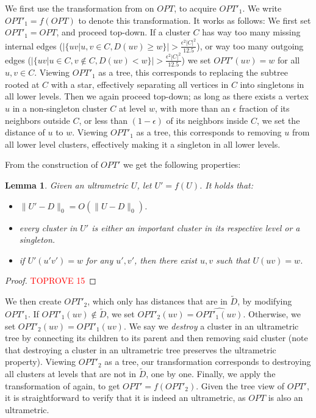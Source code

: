 \documentclass{article}
\newtheorem{lemma}[theorem]{Lemma}
\newcommand{\set}[1]{\{#1\}}
\begin{document}
We first use the transformation from \cite{cohen2022fitting} on $OPT$, to acquire $OPT'_1$.
We write $OPT'_1 = f(OPT)$ to denote this transformation.
It works as follows:
We first set $OPT'_1 = OPT$, and proceed top-down.
If a cluster $C$ has way too many missing internal edges ($|\set{uv | u,v \in C, D(uv) \ge w}| > \frac{\epsilon^2 |C|^2}{12.5}$), or way too many outgoing edges ($|\set{uv | u \in C, v \not \in C, D(uv) < w}| > \frac{\epsilon^2 |C|^2}{12.5}$) we set $OPT'(uv)=w$ for all $u,v\in C$.
Viewing $OPT'_1$ as a tree, this corresponds to replacing the subtree rooted at $C$ with a star, effectively separating all vertices in $C$ into singletons in all lower levels.
Then we again proceed top-down; as long as there exists a vertex $u$ in a non-singleton cluster $C$ at level $w$, with more than an $\epsilon$ fraction of its neighbors outside $C$, or less than $(1-\epsilon)$ of its neighbors inside $C$, we set the distance of $u$ to $w$.
Viewing $OPT'_1$ as a tree, this corresponds to removing $u$ from all lower level clusters, effectively making it a singleton in all lower levels.

From the construction of $OPT'$ we get the following properties:

\begin{lemma} \label{lem:transformationVincent}
Given an ultrametric $U$, let $U' = f(U)$.
It holds that:
\begin{itemize}
    \item $\|U'-D\|_0 = O(\|U-D\|_0)$.
    \item every cluster in $U'$ is either an important cluster in its respective level or a singleton.
    \item if $U'(u'v') = w$ for any $u',v'$, then there exist $u,v$ such that $U(uv) = w$.
\end{itemize} 
\end{lemma}
\begin{proof}\textcolor{red}{TOPROVE 15}\end{proof}

We then create $OPT'_2$, which only has distances that are in $\widetilde{D}$, by modifying $OPT'_1$.
If $OPT'_1(uv)\not\in \widetilde{D}$, we set $OPT'_2(uv) = \widehat{OPT'_1(uv)}$.
Otherwise, we set $OPT'_2(uv) = OPT'_1(uv)$.
We say we \emph{destroy} a cluster in an ultrametric tree by connecting its children to its parent and then removing said cluster (note that destroying a cluster in an ultrametric tree preserves the ultrametric property).
Viewing $OPT'_2$ as a tree, our transformation corresponds to destroying all clusters at levels that are not in $\widetilde{D}$, one by one.
Finally, we apply the transformation of  again, to get $OPT' = f(OPT'_2)$.
Given the tree view of $OPT'$, it is straightforward to verify that it is indeed an ultrametric, as $OPT$ is also an ultrametric.
\end{document}
